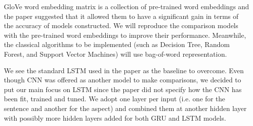 \documentclass[comsoc,conference]{IEEEtran}
\begin{document}
GloVe word embedding matrix is a collection of pre-trained word embeddings and the paper suggested that it allowed them to have a significant gain in terms of the accuracy of models constructed. We will reproduce the comparison models with the pre-trained word embeddings to improve their performance. Meanwhile, the classical algorithms  to be implemented (such as Decision Tree, Random Forest, and Support Vector Machines) will use bag-of-word representation.

\par We see the standard LSTM used in the paper as the baseline to overcome. Even though CNN was offered as another model to make comparisons, we decided to put our main focus on LSTM since the paper did not specify how the CNN has been fit, trained and tuned. We adopt one layer per input (i.e. one for the sentence and another for the aspect) and combined them at another hidden layer with possibly more hidden layers added for both GRU and LSTM models.
\end{document}
